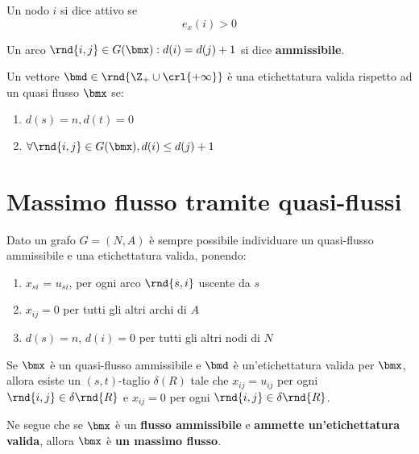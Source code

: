 \documentclass[\main/main.tex]{subfiles}
\begin{document}
\begin{definition}
  Un nodo \(i\) si dice attivo se \[e_x(i) > 0\]
\end{definition}
\begin{definition}
  Un arco \(\rnd{i,j} \in G(\bmx):  d(i) = d(j) +1\) si dice \textbf{ammissibile}.
\end{definition}
\begin{definition}
  Un vettore \(\bmd \in \rnd{\Z_+ \cup \crl{+\infty}}\) è una etichettatura valida rispetto ad un quasi flusso \(\bmx\) se:
  \begin{enumerate}
    \item \(d(s) = n, d(t) = 0\)
    \item \(\forall \rnd{i,j} \in G(\bmx), d(i) \leq d(j) +1\)
  \end{enumerate}
\end{definition}
\clearpage
\section{Massimo flusso tramite quasi-flussi}
Dato un grafo \(G = (N, A)\) è sempre possibile individuare un quasi-flusso ammissibile e una etichettatura valida, ponendo:

\begin{enumerate}
  \item \(x_{si}\) = \(u_{si}\), per ogni arco \(\rnd{s,i}\) uscente da \(s\)
  \item \(x_{ij} = 0\) per tutti gli altri archi di \(A\)
  \item \(d(s) = n\), \(d(i) = 0\) per tutti gli altri nodi di \(N\)
\end{enumerate}

\begin{theorem}
  Se \(\bmx\) è un quasi-flusso ammissibile e \(\bmd\) è un'etichettatura valida per \(\bmx\), allora esiste un \((s,t)\)-taglio \(\delta(R)\) tale che \(x_{ij}=u_{ij}\) per ogni \(\rnd{i,j}\in \delta\rnd{R}\) e \(x_{ij}=0\) per ogni \(\rnd{i,j} \in \delta\rnd{R}\).

  Ne segue che se \(\bmx\) è un \textbf{flusso ammissibile} e \textbf{ammette un'etichettatura valida}, allora \(\bmx\) è \textbf{un massimo flusso}.
\end{theorem}
\end{document}
